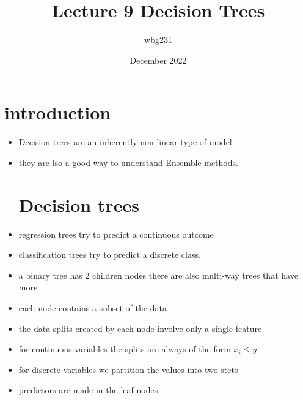 \documentclass{article}
\title{Lecture 9 Decision  Trees}
\author{wbg231 }
\date{December 2022}
\begin{document}
\maketitle

\section*{introduction}
\begin{itemize}
\item Decision trees are an inherently non linear type of model
\item they are lso a good way to understand Ensemble  methods. 
\section*{Decision trees}
\item regression trees try to predict a continuous outcome 
\item classification trees try to predict a discrete class.
\item a binary tree has 2 children nodes there are also multi-way trees that have more 
\item each node contains a subset of the data 
\item the data splits created by each node involve only a single feature 
\item for continuous variables the splits are always of the form $x_{i}\leq y$
\item for discrete variables we partition the values into two stets 
\item predictors are made in the leaf nodes 

\end{itemize}
\end{document}
